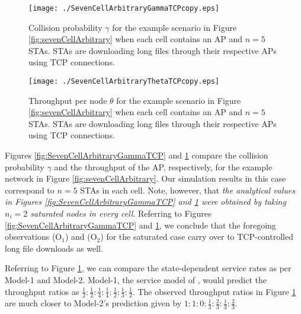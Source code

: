 \documentclass[10pt,a4paper,journal]{IEEEtran}
\theoremstyle{definition}
\theoremstyle{remark}
\theoremstyle{plain}
\begin{document}
\begin{figure}[tb]
\centering
\begin{minipage}{8.25cm}
\begin{center}
\texttt{[image: ./SevenCellArbitraryGammaTCPcopy.eps]}
\caption{Collision probability $\gamma$ for the example
  scenario in Figure \ref{fig:sevenCellArbitrary} when each cell
  contains an AP and $n = 5$ STAs.  STAs are downloading long files
  through their respective APs using TCP
  connections.\label{fig:SevenCellArbitraryGammaTCP}}
  \vspace{2mm}
\end{center}
\end{minipage}
\hfill
\begin{minipage}{8.25cm}
\begin{center}
\texttt{[image: ./SevenCellArbitraryThetaTCPcopy.eps]}
\caption{Throughput per node $\theta$ for the example
  scenario in Figure \ref{fig:sevenCellArbitrary} when each cell
  contains an AP and $n = 5$ STAs.  STAs are downloading long files
  through their respective APs using TCP
  connections.\label{fig:SevenCellArbitraryThetaTCP}}
\end{center}
\end{minipage}
\end{figure}



Figures \ref{fig:SevenCellArbitraryGammaTCP} and \ref{fig:SevenCellArbitraryThetaTCP} compare the collision probability $\gamma$ and the throughput of the AP, respectively, for the example network in Figure \ref{fig:sevenCellArbitrary}. Our simulation results in this case correspond to $n = 5$ STAs in each cell. Note, however, that \textit{the analytical values in Figures \ref{fig:SevenCellArbitraryGammaTCP} and \ref{fig:SevenCellArbitraryThetaTCP} were obtained by taking $n_i = 2$ saturated nodes in every cell}. Referring to Figures \ref{fig:SevenCellArbitraryGammaTCP} and \ref{fig:SevenCellArbitraryThetaTCP}, we conclude that the foregoing observations (O$_1$) and (O$_2$) for the saturated case carry over to TCP-controlled long file downloads as well. 

Referring to Figure \ref{fig:SevenCellArbitraryThetaTCP}, we can compare the state-dependent service rates as per Model-1 and Model-2. Model-1, the service model of \cite{wanet.bonald08multicellprocsharing}, would predict the throughput ratios as $\frac{1}{2} : \frac{1}{2} : \frac{1}{4} : \frac{1}{4} : \frac{1}{2} : \frac{1}{3} : \frac{1}{2}$. The observed throughput ratios in Figure \ref{fig:SevenCellArbitraryThetaTCP} are much closer to Model-2's prediction given by $1 : 1 : 0 : \frac{1}{3} : \frac{2}{3} : \frac{1}{3} : \frac{2}{3}$.
\end{document}
